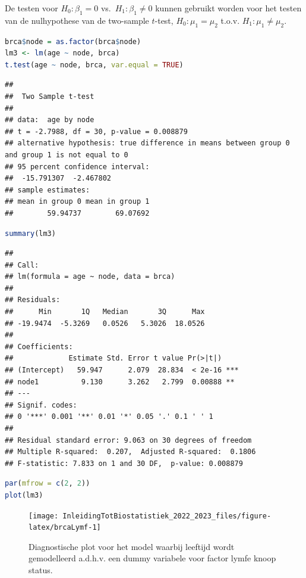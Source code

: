 \documentclass[
  12pt,dutch,coursenotes]{book}
\begin{document}
De testen voor \(H_0:\beta_1=0\) vs.~\(H_1:\beta_1\neq0\) kunnen gebruikt worden voor het testen van de nulhypothese van de two-sample \(t\)-test, \(H_0:\mu_1=\mu_2\) t.o.v. \(H_1:\mu_1\neq\mu_2\).

\begin{lstlisting}[language=R]
brca$node = as.factor(brca$node)
lm3 <- lm(age ~ node, brca)
t.test(age ~ node, brca, var.equal = TRUE)
\end{lstlisting}

\begin{lstlisting}
## 
##  Two Sample t-test
## 
## data:  age by node
## t = -2.7988, df = 30, p-value = 0.008879
## alternative hypothesis: true difference in means between group 0 and group 1 is not equal to 0
## 95 percent confidence interval:
##  -15.791307  -2.467802
## sample estimates:
## mean in group 0 mean in group 1 
##        59.94737        69.07692
\end{lstlisting}

\begin{lstlisting}[language=R]
summary(lm3)
\end{lstlisting}

\begin{lstlisting}
## 
## Call:
## lm(formula = age ~ node, data = brca)
## 
## Residuals:
##      Min       1Q   Median       3Q      Max 
## -19.9474  -5.3269   0.0526   5.3026  18.0526 
## 
## Coefficients:
##             Estimate Std. Error t value Pr(>|t|)    
## (Intercept)   59.947      2.079  28.834  < 2e-16 ***
## node1          9.130      3.262   2.799  0.00888 ** 
## ---
## Signif. codes:  
## 0 '***' 0.001 '**' 0.01 '*' 0.05 '.' 0.1 ' ' 1
## 
## Residual standard error: 9.063 on 30 degrees of freedom
## Multiple R-squared:  0.207,  Adjusted R-squared:  0.1806 
## F-statistic: 7.833 on 1 and 30 DF,  p-value: 0.008879
\end{lstlisting}

\begin{lstlisting}[language=R]
par(mfrow = c(2, 2))
plot(lm3)
\end{lstlisting}

\begin{figure}

{\centering \texttt{[image: InleidingTotBiostatistiek\_2022\_2023\_files/figure-latex/brcaLymf-1]} 

}

\caption{Diagnostische plot voor het model waarbij leeftijd wordt gemodelleerd a.d.h.v. een dummy variabele voor factor lymfe knoop status.}\label{fig:brcaLymf}
\end{figure}
\end{document}
